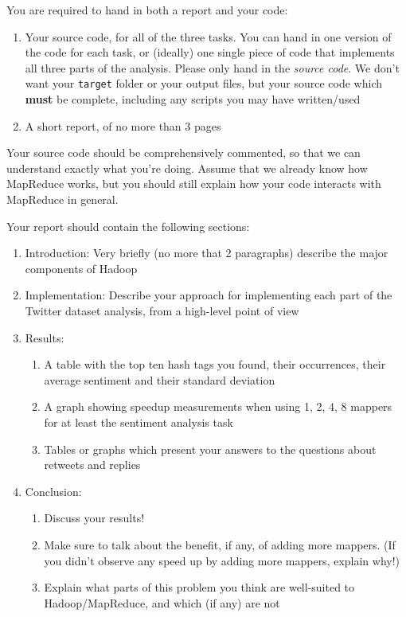 \documentclass[a4paper,10pt]{article}
\begin{document}
  You are required to hand in both a report and your code:
  \begin{enumerate}
    \item Your source code, for all of the three tasks. You can hand in one version of the code for each task, or (ideally) one single piece of code that implements all three parts of the analysis. Please only hand in the \textit{source code}. We don't want your \texttt{target} folder or your output files, but your source code which \textbf{must} be complete, including any scripts you may have written/used
    
    \item A short report, of no more than 3 pages
  \end{enumerate}
  
  Your source code should be comprehensively commented, so that we can understand exactly what you're doing. Assume that we already know how MapReduce works, but you should still explain how your code interacts with MapReduce in general. 
  
  
  Your report should contain the following sections:
  
  \begin{enumerate}
    \item Introduction: Very briefly (no more that 2 paragraphs) describe the major components of Hadoop
    \item Implementation: Describe your approach for implementing each part of the Twitter dataset analysis, from a high-level point of view
    
    \item Results: 
    \begin{enumerate}
      \item A table with the top ten hash tags you found, their occurrences, their average sentiment and their standard deviation
      \item A graph showing speedup measurements when using 1, 2, 4, 8 mappers for at least the sentiment analysis task 
      \item Tables or graphs which present your answers to the questions about retweets and replies
    \end{enumerate}
    \item Conclusion: 
    \begin{enumerate}
      \item Discuss your results!
      \item Make sure to talk about the benefit, if any, of adding more mappers. (If you didn't observe any speed up by adding more mappers, explain why!)
      \item Explain what parts of this problem you think are well-suited to Hadoop/MapReduce, and which (if any) are not
    \end{enumerate}
    
  \end{enumerate}
  
\end{document}
